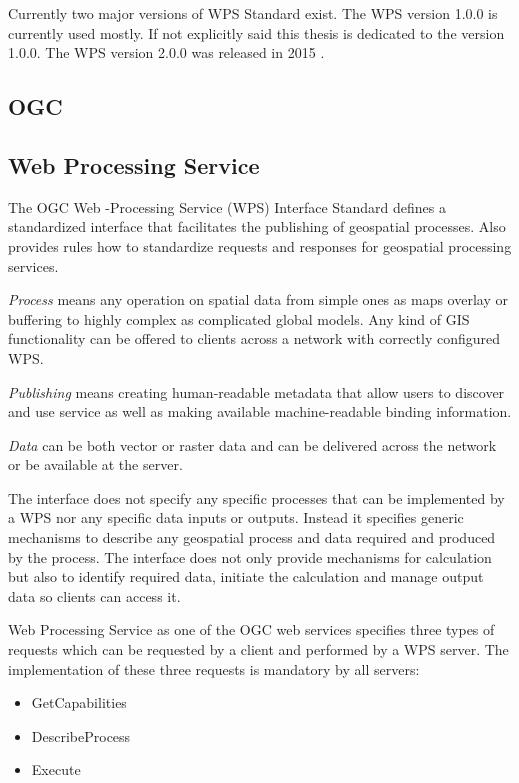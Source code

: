 \documentclass[12pt,a4paper]{article}
\begin{document}
Currently two major versions of WPS Standard exist. The WPS version 1.0.0 is currently used mostly.
If not explicitly said this thesis is dedicated to the version 1.0.0. The WPS version 2.0.0 was
released in 2015 \cite{WPS_second}.

\subsection{OGC}

\bigskip
\subsection{Web Processing Service}
The OGC Web -Processing Service (WPS) Interface Standard defines a standardized interface
that facilitates the publishing of geospatial processes. Also provides rules how to standardize
requests and responses for geospatial processing services. 

\textit{Process} means any operation on spatial
data from simple ones as maps overlay or buffering to highly complex as complicated global models. Any kind of GIS 
functionality can be offered to clients across a network with correctly configured WPS. 

\textit{Publishing} means
creating human-readable metadata that allow users to discover and use service as well as making 
available machine-readable binding information.

\textit{Data} can be both vector or raster data and can be delivered across the network or be available
at the server.

The interface does not specify any specific processes that can be implemented by a WPS nor any specific
data inputs or outputs. Instead it specifies generic mechanisms to describe any geospatial process and
data required and produced by the process. The interface does not only provide mechanisms for calculation
but also to identify required data, initiate the calculation and manage output data so clients can access it. 

\bigskip
Web Processing Service as one of the OGC web services specifies three types of requests which can be requested
by a client and performed by a WPS server. The implementation of these three requests is mandatory by all servers:
\begin{itemize}
\item{GetCapabilities}
\item{DescribeProcess}
\item{Execute}
\end{itemize}
\end{document}
